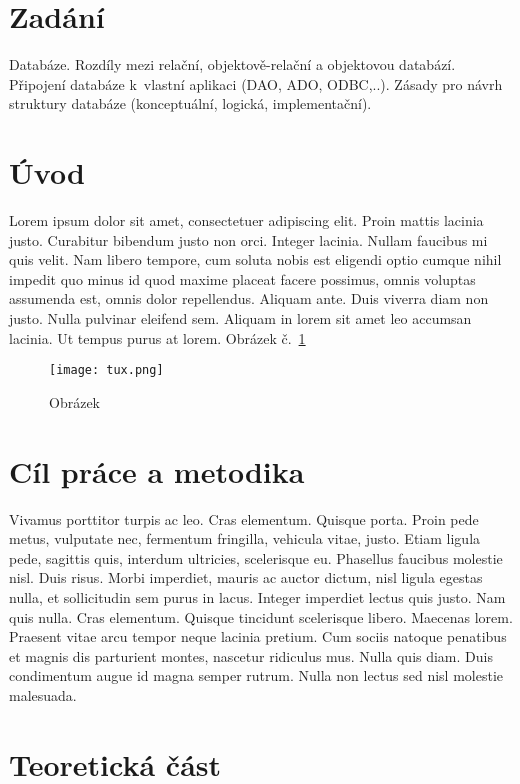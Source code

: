 \section*{Zadání}
Databáze. Rozdíly mezi relační, objektově-relační a objektovou databází. Připojení databáze k vlastní aplikaci (DAO, ADO, ODBC,..). Zásady pro návrh struktury databáze (konceptuální, logická, implementační).

\section{Úvod}
Lorem ipsum dolor sit amet, consectetuer adipiscing elit. Proin mattis lacinia justo. Curabitur bibendum justo non orci. Integer lacinia. Nullam faucibus mi quis velit. Nam libero tempore, cum soluta nobis est eligendi optio cumque nihil impedit quo minus id quod maxime placeat facere possimus, omnis voluptas assumenda est, omnis dolor repellendus. Aliquam ante. Duis viverra diam non justo. Nulla pulvinar eleifend sem. Aliquam in lorem sit amet leo accumsan lacinia. Ut tempus purus at lorem. Obrázek č.~\ref{fig:tux}

\begin{figure}[htbp]
  \centering
  \texttt{[image: tux.png]}
  \caption{Obrázek}
  \label{fig:tux}
\end{figure}

\section{Cíl práce a metodika}
Vivamus porttitor turpis ac leo. Cras elementum. Quisque porta. Proin pede metus, vulputate nec, fermentum fringilla, vehicula vitae, justo. Etiam ligula pede, sagittis quis, interdum ultricies, scelerisque eu. Phasellus faucibus molestie nisl. Duis risus. Morbi imperdiet, mauris ac auctor dictum, nisl ligula egestas nulla, et sollicitudin sem purus in lacus. Integer imperdiet lectus quis justo. Nam quis nulla. Cras elementum. Quisque tincidunt scelerisque libero. Maecenas lorem. Praesent vitae arcu tempor neque lacinia pretium. Cum sociis natoque penatibus et magnis dis parturient montes, nascetur ridiculus mus. Nulla quis diam. Duis condimentum augue id magna semper rutrum. Nulla non lectus sed nisl molestie malesuada.

\section{Teoretická část}

